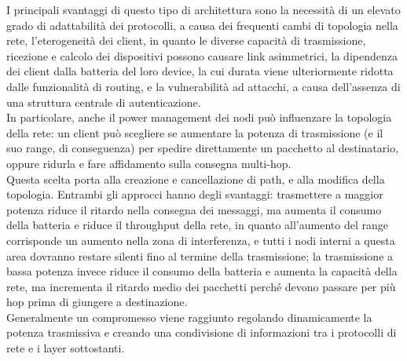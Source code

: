 I principali svantaggi di questo tipo di architettura sono la necessità di un elevato grado di adattabilità dei protocolli, a causa dei frequenti cambi di topologia nella rete, l'eterogeneità dei client, in quanto le diverse capacità di trasmissione, ricezione e calcolo dei dispositivi possono causare link asimmetrici, la dipendenza dei client dalla batteria del loro device, la cui durata viene ulteriormente ridotta dalle funzionalità di routing, e la vulnerabilità ad attacchi, a causa dell'assenza di una struttura centrale di autenticazione. \cite{jayakumar2007ad}
\\
In particolare, anche il power management dei nodi può influenzare la topologia della rete: un client può scegliere se aumentare la potenza di trasmissione (e il suo range, di conseguenza) per spedire direttamente un pacchetto al destinatario, oppure ridurla e fare affidamento sulla consegna multi-hop.\\
Questa scelta porta alla creazione e cancellazione di path, e alla modifica della topologia. 
Entrambi gli approcci hanno degli svantaggi: trasmettere a maggior potenza riduce il ritardo nella consegna dei messaggi, ma aumenta il consumo della batteria e riduce il throughput della rete, in quanto all'aumento del range corrisponde un aumento nella zona di interferenza, e tutti i nodi interni a questa area dovranno restare silenti fino al termine della trasmissione; la trasmissione a bassa potenza invece riduce il consumo della batteria e aumenta la capacità della rete, ma incrementa il ritardo medio dei pacchetti perché devono passare per più hop prima di giungere a destinazione. \\
Generalmente un compromesso viene raggiunto regolando dinamicamente la potenza trasmissiva e creando una condivisione di informazioni tra i protocolli di rete e i layer sottostanti. \cite{879383}


